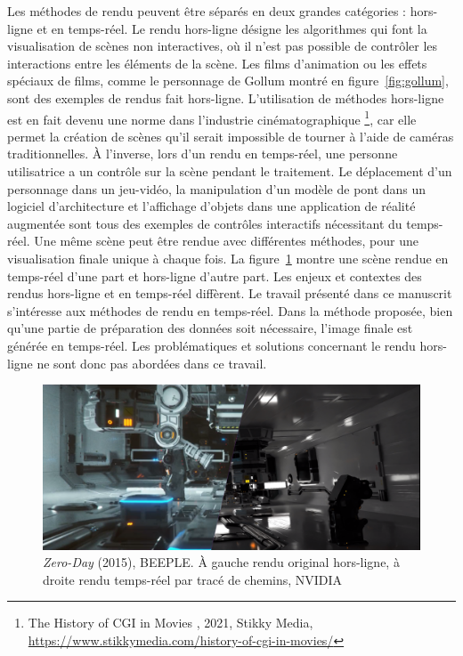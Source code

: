 Les méthodes de rendu peuvent être séparés en deux grandes catégories : hors-ligne et en temps-réel. Le rendu hors-ligne désigne les algorithmes qui font la visualisation de scènes non interactives, où il n'est pas possible de contrôler les interactions entre les éléments de la scène. Les films d'animation ou les effets spéciaux de films, comme le personnage de Gollum montré en figure~\ref{fig:gollum}, sont des exemples de rendus fait hors-ligne. L'utilisation de méthodes hors-ligne est en fait devenu une norme dans l'industrie cinématographique \footnote{\og The History of CGI in Movies \fg, 2021, Stikky Media, \url{https://www.stikkymedia.com/history-of-cgi-in-movies/}}, car elle permet la création de scènes qu'il serait impossible de tourner à l'aide de caméras traditionnelles. À l'inverse, lors d'un rendu en temps-réel, une personne utilisatrice a un contrôle sur la scène pendant le traitement. Le déplacement d'un personnage dans un jeu-vidéo, la manipulation d'un modèle de pont dans un logiciel d'architecture et l'affichage d'objets dans une application de réalité augmentée sont tous des exemples de contrôles interactifs nécessitant du temps-réel. Une même scène peut être rendue avec différentes méthodes, pour une visualisation finale unique à chaque fois. La figure~\ref{fig:zero-day} montre une scène rendue en temps-réel d'une part et hors-ligne d'autre part. Les enjeux et contextes des rendus hors-ligne et en temps-réel diffèrent. Le travail présenté dans ce manuscrit s'intéresse aux méthodes de rendu en temps-réel. Dans la méthode proposée, bien qu'une partie de préparation des données soit nécessaire, l'image finale est générée en temps-réel. Les problématiques et solutions concernant le rendu hors-ligne ne sont donc pas abordées dans ce travail.

\bigskip

\begin{figure}[ht]
    \centering
    \includegraphics[width=\textwidth]{contenu/resources/images/zero_day_comparison}
    \caption[\textit{Zero-Day} (2015), BEEPLE]{\textit{Zero-Day} (2015), BEEPLE. À gauche rendu original hors-ligne, à droite rendu temps-réel par tracé de chemins, NVIDIA~\cite{winkelman_zero-day_2019}}
    \label{fig:zero-day}
\end{figure}

